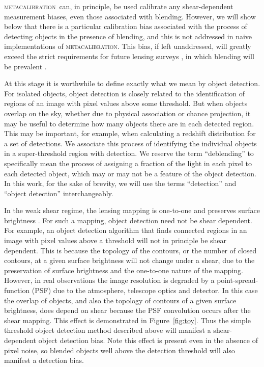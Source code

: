 \documentclass[iop, twocolappendix, appendixfloats, numberedappendix, apj]{hackemulateapj}
\newcommand{\mcal}{\textsc{metacalibration}}
\begin{document}
\mcal\ can, in principle, be used calibrate any shear-dependent measurement
biases, even those associated with blending.  However, we will show below that
there is a particular calibration bias associated with the process of detecting
objects in the presence of blending, and this is not addressed in naive
implementations of \mcal. This bias, if left unaddressed, will greatly exceed
the strict requirements for future lensing surveys \citep{huterer2006}, in
which blending will be prevalent \citep{DawsonBlending2016}.

At this stage it is worthwhile to define exactly what we mean by object
detection.  For isolated objects, object detection is closely related to the
identification of regions of an image with pixel values above some threshold.
But when objects overlap on the sky, whether due to physical association or
chance projection, it may be useful to determine how many objects there are in
each detected region. This may be important, for example, when calculating a
redshift distribution for a set of detections.  We associate this process of
identifying the individual objects in a super-threshold region with detection.
We reserve the term ``deblending'' to specifically mean the process of
assigning a fraction of the light in each pixel to each detected object, which
may or may not be a feature of the object detection.  In this work, for the
sake of brevity, we will use the terms ``detection'' and ``object detection''
interchangeably.

In the weak shear regime, the lensing mapping is one-to-one and preserves
surface brightness \citep{SchneiderBook92}. For such a mapping, object
detection need not be shear dependent. For example, an object detection
algorithm that finds connected regions in an image with pixel values above a
threshold will not in principle be shear dependent.  This is because the
topology of the contours, or the number of closed contours, at a given surface
brightness will not change under a shear, due to the preservation of surface
brightness and the one-to-one nature of the mapping.  However, in real
observations the image resolution is degraded by a point-spread-function (PSF)
due to the atmosphere, telescope optics and detector. In this case the overlap
of objects, and also the topology of contours of a given surface brightness,
does depend on shear because the PSF convolution occurs after the shear
mapping.  This effect is demonstrated in Figure~\ref{fig:toy}.  Thus the simple
threshold object detection method described above will manifest a
shear-dependent object detection bias.  Note this effect is present even in the
absence of pixel noise, so blended objects well above the detection threshold
will also manifest a detection bias.
\end{document}
